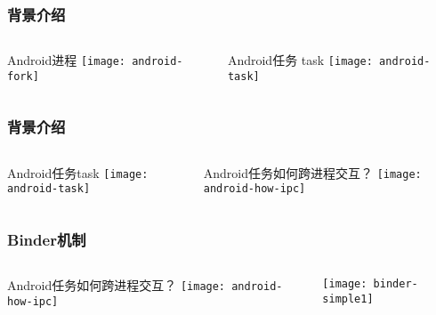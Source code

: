 \begin{frame}[fragile]
	\frametitle{背景介绍}
	
	\begin{columns}
		\begin{column}{.5\textwidth}
			Android进程
			\texttt{[image: android-fork]}
			
		\end{column}
		\begin{column}{.5\textwidth}
			Android任务 task
			\texttt{[image: android-task]}
			
		\end{column}
	\end{columns}
\end{frame}

\begin{frame}[fragile]
	\frametitle{背景介绍}
	
	\begin{columns}
		\begin{column}{.5\textwidth}
			Android任务task
			\texttt{[image: android-task]}
			
		\end{column}
		\begin{column}{.5\textwidth}
			Android任务如何跨进程交互？
			\texttt{[image: android-how-ipc]}
			
		\end{column}
	\end{columns}
\end{frame}


\begin{frame}[fragile]
	\frametitle{Binder机制}
	
	\begin{columns}
		\begin{column}{.5\textwidth}
			Android任务如何跨进程交互？
			\texttt{[image: android-how-ipc]}
			
		\end{column}
		\begin{column}{.5\textwidth}
			
			\texttt{[image: binder-simple1]}
			
		\end{column}
	\end{columns}
\end{frame}


